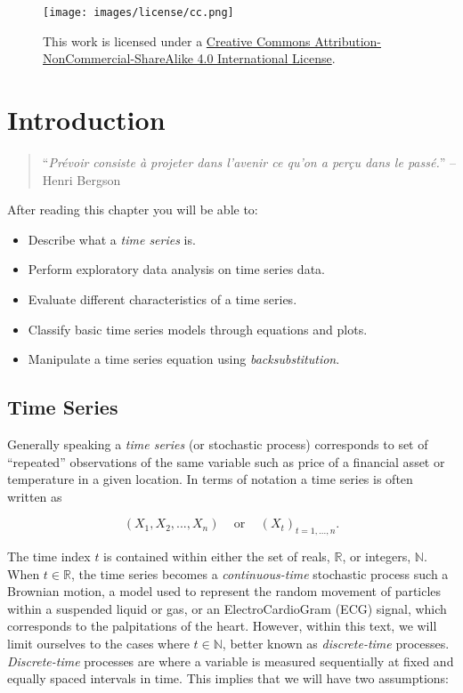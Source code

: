 \documentclass[]{book}
\providecommand{\tightlist}{%
  \setlength{\itemsep}{0pt}\setlength{\parskip}{0pt}}
\theoremstyle{definition}
\theoremstyle{definition}
\theoremstyle{definition}
\theoremstyle{remark}
\begin{document}
\begin{figure}
\centering
\texttt{[image: images/license/cc.png]}
\caption{This work is licensed under a
\href{http://creativecommons.org/licenses/by-nc-sa/4.0/}{Creative
Commons Attribution-NonCommercial-ShareAlike 4.0 International
License}.}
\end{figure}

\hypertarget{introduction-1}{%
\chapter{Introduction}\label{introduction-1}}

\begin{quote}
``\emph{Prévoir consiste à projeter dans l'avenir ce qu'on a perçu dans
le passé.}'' -- Henri Bergson
\end{quote}

After reading this chapter you will be able to:

\begin{itemize}
\tightlist
\item
  Describe what a \emph{time series} is.
\item
  Perform exploratory data analysis on time series data.
\item
  Evaluate different characteristics of a time series.
\item
  Classify basic time series models through equations and plots.
\item
  Manipulate a time series equation using \emph{backsubstitution}.
\end{itemize}

\hypertarget{time-series}{%
\section{Time Series}\label{time-series}}

Generally speaking a \emph{time series} (or stochastic process)
corresponds to set of ``repeated'' observations of the same variable
such as price of a financial asset or temperature in a given location.
In terms of notation a time series is often written as

\[\left(X_1, X_2, ..., X_n \right) \;\;\; \text{ or } \;\;\; \left(X_t\right)_{t = 1,...,n}.\]

The time index \(t\) is contained within either the set of reals,
\(\mathbb{R}\), or integers, \(\mathbb{N}\). When \(t \in \mathbb{R}\),
the time series becomes a \emph{continuous-time} stochastic process such
a Brownian motion, a model used to represent the random movement of
particles within a suspended liquid or gas, or an ElectroCardioGram
(ECG) signal, which corresponds to the palpitations of the heart.
However, within this text, we will limit ourselves to the cases where
\(t \in \mathbb{N}\), better known as \emph{discrete-time} processes.
\emph{Discrete-time} processes are where a variable is measured
sequentially at fixed and equally spaced intervals in time. This implies
that we will have two assumptions:
\end{document}
